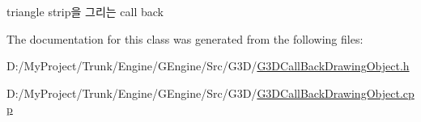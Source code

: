 \begin{DoxyItemize}
\item triangle strip을 그리는 call back 
\end{DoxyItemize}

The documentation for this class was generated from the following files\+:\begin{DoxyCompactItemize}
\item 
D\+:/\+My\+Project/\+Trunk/\+Engine/\+G\+Engine/\+Src/\+G3\+D/\hyperlink{_g3_d_call_back_drawing_object_8h}{G3\+D\+Call\+Back\+Drawing\+Object.\+h}\item 
D\+:/\+My\+Project/\+Trunk/\+Engine/\+G\+Engine/\+Src/\+G3\+D/\hyperlink{_g3_d_call_back_drawing_object_8cpp}{G3\+D\+Call\+Back\+Drawing\+Object.\+cpp}\end{DoxyCompactItemize}
